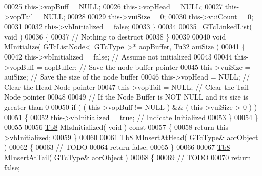 \begin{DoxyCode}
00025             this->vopBuff = NULL;
00026             this->vopHead = NULL;
00027             this->vopTail = NULL;
00028 
00029             this->vuiSize  = 0;
00030             this->vuiCount = 0;
00031 
00032             this->vbInitialized = \textcolor{keyword}{false};
00033          \}
00034 
00035          ~\mbox{\hyperlink{class_g_n_common_1_1_n_containers_1_1_g_tc_linked_list}{GTcLinkedList}}( \textcolor{keywordtype}{void} )
00036          \{
00037             \textcolor{comment}{// Nothing to destruct}
00038          \}
00039 
00040          \textcolor{keywordtype}{void} MInitialize( \mbox{\hyperlink{class_g_n_common_1_1_n_containers_1_1_g_tc_list_node}{GTcListNode< GTcType >}}* aopBuffer, 
      \mbox{\hyperlink{namespace_g_n_common_a941b527ef318f318aed7903dc832b7e4}{Tu32}} auiSize )
00041          \{
00042             this->vbInitialized = \textcolor{keyword}{false};  \textcolor{comment}{// Assume not initialized}
00043 
00044             this->vopBuff = aopBuffer; \textcolor{comment}{// Save the node buffer pointer}
00045             this->vuiSize = auiSize;   \textcolor{comment}{// Save the size of the node buffer}
00046             this->vopHead = NULL;      \textcolor{comment}{// Clear the Head Node pointer}
00047             this->vopTail = NULL;      \textcolor{comment}{// Clear the Tail Node pointer}
00048 
00049                                        \textcolor{comment}{// If the Node Buffer is NOT NULL and its size is greater than 0}
00050             \textcolor{keywordflow}{if} ( ( this->vopBuff != NULL ) && ( this->vuiSize > 0 ) )
00051             \{
00052                this->vbInitialized = \textcolor{keyword}{true}; \textcolor{comment}{// Indicate Initialized}
00053             \}
00054          \}
00055 
00056          \mbox{\hyperlink{namespace_g_n_common_a8115dc7ed53b6e5b52e6bfde1632ea74}{Tb8}} MIsInitialized( \textcolor{keywordtype}{void} )\textcolor{keyword}{ const}
00057 \textcolor{keyword}{         }\{
00058             \textcolor{keywordflow}{return} this->vbInitialized;
00059          \}
00060 
00061          \mbox{\hyperlink{namespace_g_n_common_a8115dc7ed53b6e5b52e6bfde1632ea74}{Tb8}} MInsertAtHead( GTcType& aorObject )
00062          \{
00063             \textcolor{comment}{// TODO}
00064             \textcolor{keywordflow}{return} \textcolor{keyword}{false};
00065          \}
00066 
00067          \mbox{\hyperlink{namespace_g_n_common_a8115dc7ed53b6e5b52e6bfde1632ea74}{Tb8}} MInsertAtTail( GTcType& aorObject )
00068          \{
00069             \textcolor{comment}{// TODO}
00070             \textcolor{keywordflow}{return} \textcolor{keyword}{false};

\end{DoxyCode}
